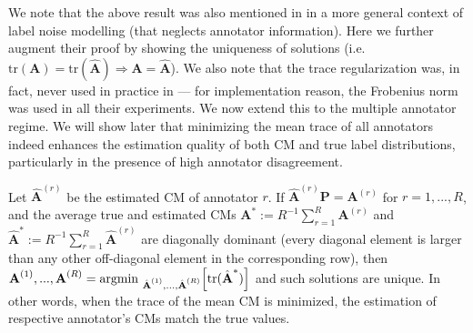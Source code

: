 We note that the above result was also mentioned in \cite{sukhbaatar2014training} in a more general context of label noise modelling (that neglects annotator information). Here we further augment their proof by showing the uniqueness of solutions (i.e.  $\text{tr}(\textbf{A})= \text{tr}(\hat{\textbf{A}})	\Rightarrow \textbf{A} = \hat{\textbf{A}}$). We also note that the trace regularization was, in fact, never used in practice in \cite{sukhbaatar2014training} --- for implementation reason, the Frobenius norm was used in all their experiments.  We now extend this to the multiple annotator regime. We will show later that minimizing the mean trace of all annotators indeed enhances the estimation quality of both CM and true label distributions, particularly in the presence of high annotator disagreement. 

\begin{theorem}\label{theorem:main}
Let $\hat{\textbf{A}}^{(r)}$ be the estimated CM of annotator $r$. If $\hat{\textbf{A}}^{(r)}\textbf{P}=\textbf{A}^{(r)}$ for $r=1,...,R$, and the average true and estimated CMs $\textbf{A}^{*}:=R^{-1}\sum_{r=1}^R\textbf{A}^{(r)}$ and $\hat{\textbf{A}}^{*}:=R^{-1}\sum_{r=1}^R\hat{\textbf{A}}^{(r)}$ are diagonally dominant (every diagonal element is larger than any other off-diagonal element in the corresponding row), then  $\textbf{A}^{(1)}, ..., \textbf{A}^{(R)} = \text{argmin }_{\hat{\textbf{A}}^{(1)}, ..., \hat{\textbf{A}}^{(R)}}\Big{[}\text{tr}(\hat{\textbf{A}}^{*})\Big{]}$ and such solutions are unique. In other words, when the trace of the mean CM is minimized, the estimation of respective annotator's CMs match the true values. 
\end{theorem}

